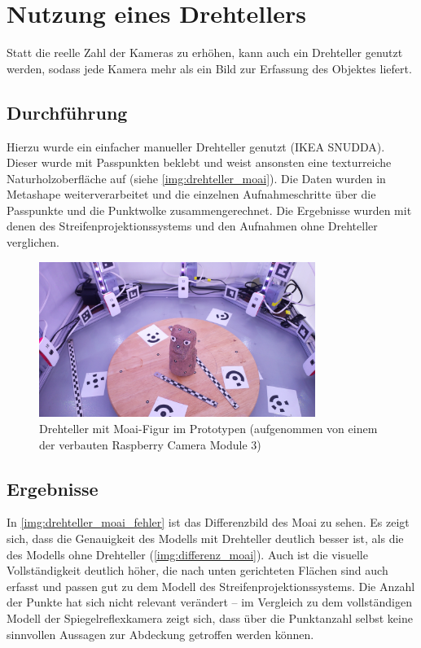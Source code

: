 \documentclass[./00PhotoBox.tex]{subfiles}
\begin{document}
\section{Nutzung eines Drehtellers}
\label{s:drehteller}
Statt die reelle Zahl der Kameras zu erhöhen, kann auch ein Drehteller genutzt werden, sodass jede Kamera mehr als ein Bild zur Erfassung des Objektes liefert.

\subsection{Durchführung}
Hierzu wurde ein einfacher manueller Drehteller genutzt (IKEA SNUDDA). Dieser wurde mit Passpunkten beklebt und weist ansonsten eine texturreiche Naturholzoberfläche auf (siehe \autoref{img:drehteller_moai}). Die Daten wurden in Metashape weiterverarbeitet und die einzelnen Aufnahmeschritte über die Passpunkte und die Punktwolke zusammengerechnet. Die Ergebnisse wurden mit denen des Streifenprojektionssystems und den Aufnahmen ohne Drehteller verglichen.

\begin{figure}
    \centering
    \includegraphics[width=0.8\textwidth]{img/drehteller_moai.jpg}
    \caption{Drehteller mit Moai-Figur im Prototypen (aufgenommen von einem der verbauten Raspberry Camera Module 3)}
    \label{img:drehteller_moai}
\end{figure}

\subsection{Ergebnisse}

In \autoref{img:drehteller_moai_fehler} ist das Differenzbild des Moai zu sehen. Es zeigt sich, dass die Genauigkeit des Modells mit Drehteller deutlich besser ist, als die des Modells ohne Drehteller (\autoref{img:differenz_moai}). Auch ist die visuelle Vollständigkeit deutlich höher, die nach unten gerichteten Flächen sind auch erfasst und passen gut zu dem Modell des Streifenprojektionssystems. Die Anzahl der Punkte hat sich nicht relevant verändert -- im Vergleich zu dem vollständigen Modell der Spiegelreflexkamera zeigt sich, dass über die Punktanzahl selbst keine sinnvollen Aussagen zur Abdeckung getroffen werden können.
\end{document}
